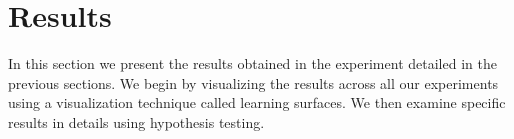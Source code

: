 \chapter{Results}
In this section we present the results obtained in the experiment detailed in the previous sections. We begin by visualizing the results across all our experiments using a visualization technique called learning surfaces. We then examine specific results in details using hypothesis testing.

